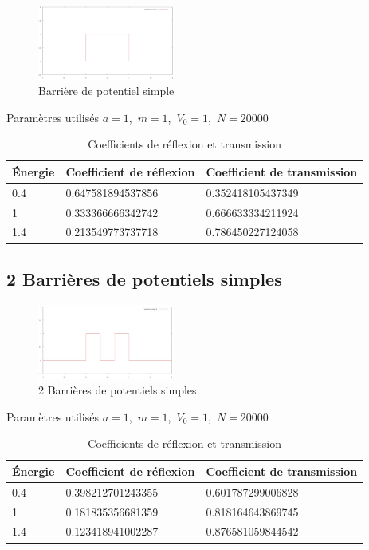 \begin{figure}[!ht]
    \center
    \includegraphics[width=0.4\textwidth]{potentielbarriere.jpg}
    \caption{Barrière de potentiel simple }
    \label{potentielbarriere}
\end{figure}

\begin{table}[!ht]
\centering
Paramètres utilisés  $a=1$,\ $m=1$,\ $V_{0}=1$,\ $N=20000$\\
\begin{tabular}{|l|l|l|}
\hline  Énergie & Coefficient de réflexion  & Coefficient de transmission \\
\hline  0.4 &   0.647581894537856 &  0.352418105437349\\
\hline 1 &  0.333366666342742 & 0.666633334211924\\ 
\hline 1.4 & 0.213549773737718 & 0.786450227124058\\
\hline
\end{tabular}
\caption{Coefficients de réflexion et transmission}
\label{tab3}
\end{table}

\subsection{ 2 Barrières de potentiels simples}

\begin{figure}[!ht]
    \center
    \includegraphics[width=0.4\textwidth]{potentiel2barriere.jpg}
    \caption{2 Barrières de potentiels simples }
    \label{potentiel2barriere}
\end{figure}

\begin{table}[!ht]
\centering
Paramètres utilisés  $a=1$,\ $m=1$,\ $V_{0}=1$,\ $N=20000$\\
\begin{tabular}{|l|l|l|}
\hline  Énergie & Coefficient de réflexion  & Coefficient de transmission \\
\hline  0.4 &  0.398212701243355 &  0.601787299006828\\
\hline 1 & 0.181835356681359 &0.818164643869745\\ 
\hline 1.4 & 0.123418941002287 & 0.876581059844542\\
\hline
\end{tabular}
\caption{Coefficients de réflexion et transmission}
\label{tab4}
\end{table}



